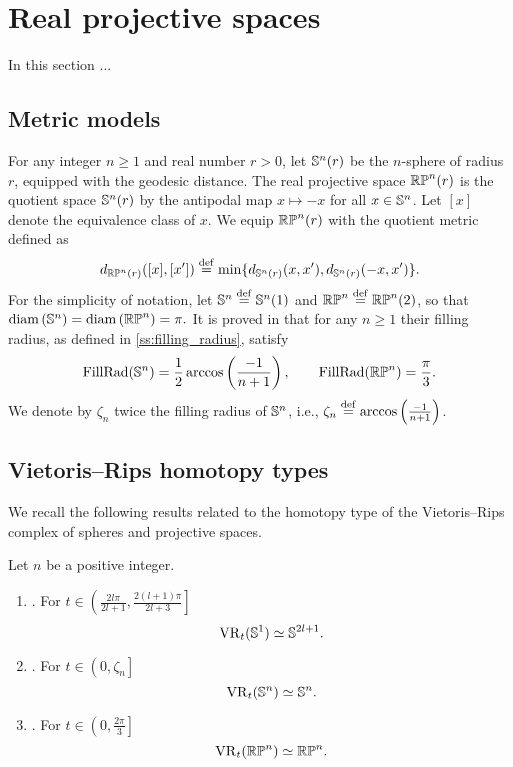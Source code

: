 
\section{Real projective spaces}\label{s:continuous}

In this section ...

\subsection{Metric models}

For any integer $n\geq 1$ and real number $r>0$, let $\mathbb{S}^n(r)$ be the $n$-sphere of radius $r$, equipped with the geodesic distance.
The real projective space $\mathbb{RP}^n(r)$ is the quotient space $\mathbb{S}^n(r)$ by the antipodal map $x \mapsto -x$ for all $x \in \mathbb{S}^n$.
Let $[x]$ denote the equivalence class of $x$. We equip $\mathbb{RP}^n(r)$ with the quotient metric defined as
\[
d_{\mathbb{RP}^n(r)}([x],[x'])\stackrel{\mathrm{def}}{=}\min \{d_{\mathbb{S}^n(r)}(x,x'),d_{\mathbb{S}^n(r)}(-x,x')\}.
\]
For the simplicity of notation, let $\mathbb{S}^n\stackrel{\mathrm{def}}{=}\mathbb{S}^n(1)$ and $\mathbb{RP}^n\stackrel{\mathrm{def}}{=}\mathbb{RP}^n(2)$, so that $\operatorname{diam}\left(\mathbb{S}^n \right)=\operatorname{diam}\left(\mathbb{RP}^n \right)=\pi.$
It is proved in \cite{katz1983filling} that for any $n \geq 1$ their filling radius, as defined in \cref{ss:filling_radius}, satisfy
\[
\operatorname{FillRad}(\mathbb{S}^n) = \frac{1}{2}\arccos\left(\frac{-1}{n+1}\right), \qquad \operatorname{FillRad}(\mathbb{RP}^n)=\frac{\pi}{3}.
\]
We denote by $\zeta_n$ twice the filling radius of $\mathbb{S}^n$, i.e., $\zeta_n \stackrel{\mathrm{def}}{=} \arccos\left(\frac{-1}{n+1}\right)$.

\subsection{Vietoris--Rips homotopy types}

We recall the following results related to the homotopy type of the Vietoris--Rips complex of spheres and projective spaces.

\begin{proposition}
	Let $n$ be a positive integer.
	\begin{enumerate}[{\rm (a)}]
		\item\label{prop:S1}{\rm \cite[Thm.~7.4]{adamaszek2017vietoris}.}
		For $t \in \left(\frac{2l\pi}{2l+1}, \frac{2(l+1)\pi}{2l+3}\right]$
		\[
		\operatorname{VR}_t(\mathbb{S}^1) \simeq \mathbb{S}^{2l+1}.
		\]

		\item\label{prop:Sn}{\rm \cite[Thm.~10]{lim2020vietoris}.}
		For $t \in \left(0, \zeta_n\right]$
		\[
		\operatorname{VR}_t(\mathbb{S}^n) \simeq \mathbb{S}^n.
		\]

		\item\label{prop:RPn}{\rm \cite[Thm.~4.5]{adams2022metric}.}
		For $t \in \left(0,\frac{2\pi}{3} \right]$
		\[
		\operatorname{VR}_t(\mathbb{RP}^n) \simeq \mathbb{RP}^n.
		\]
	\end{enumerate}
\end{proposition}

